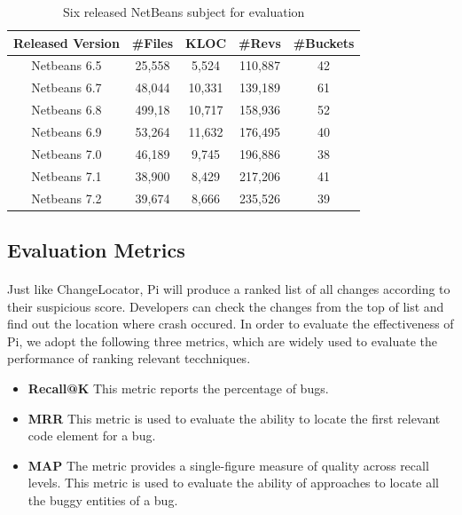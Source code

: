 \documentclass[a4paper]{article}
\begin{document}
\begin{table}[!htbp]
\centering
\caption{Six released NetBeans subject for evaluation }\label{NetBeansProject}
\begin{tabular}{ccccc}
\toprule
Released Version & \#Files & KLOC & \#Revs & \#Buckets \\
\midrule
Netbeans 6.5 & 25,558 & 5,524 & 110,887 &  42 \\
Netbeans 6.7 & 48,044 & 10,331 & 139,189 & 61 \\
Netbeans 6.8 & 499,18 & 10,717 & 158,936 & 52 \\
Netbeans 6.9 & 53,264 & 11,632 & 176,495 & 40 \\
Netbeans 7.0 & 46,189 & 9,745 & 196,886 & 38 \\
Netbeans 7.1 & 38,900 & 8,429 & 217,206 & 41 \\
Netbeans 7.2 & 39,674 & 8,666 & 235,526 & 39 \\
\bottomrule
\end{tabular}
\end{table}


\subsection{Evaluation Metrics}
\paragraph{}
Just like ChangeLocator, Pi will produce a ranked list of all changes according to their suspicious score. Developers can check the changes from the top of list and find out the location where crash occured. In order to evaluate the effectiveness of Pi, we adopt the following three metrics, which are widely used to evaluate the performance of ranking relevant tecchniques.\\
\vspace{-1em}

\begin{itemize}
\item \textbf{Recall@K}
This metric reports the percentage of bugs.
\item \textbf{MRR}
This metric is used to evaluate the ability to locate the first relevant code element for a bug.
\item \textbf{MAP}
The metric provides a single-figure measure of quality across recall levels. This metric is used to evaluate the ability of approaches to locate all the buggy entities of a bug.
\end{itemize}
\end{document}
